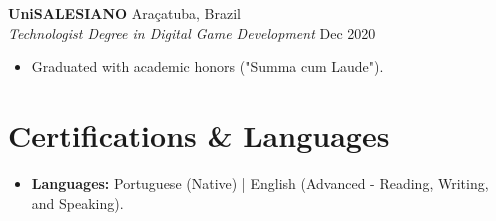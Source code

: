 \documentclass[a4paper,10pt]{article}
\begin{document}
\vspace{2pt}

\noindent \textbf{UniSALESIANO} \hfill Araçatuba, Brazil \\
\textit{Technologist Degree in Digital Game Development} \hfill Dec 2020
\begin{itemize}[noitemsep, topsep=0pt]
    \item Graduated with academic honors ("Summa cum Laude").
\end{itemize}

\section{Certifications \& Languages}
\begin{itemize}[noitemsep, leftmargin=*]
    \item \textbf{Languages:} Portuguese (Native) | English (Advanced - Reading, Writing, and Speaking).
\end{itemize}
\end{document}
